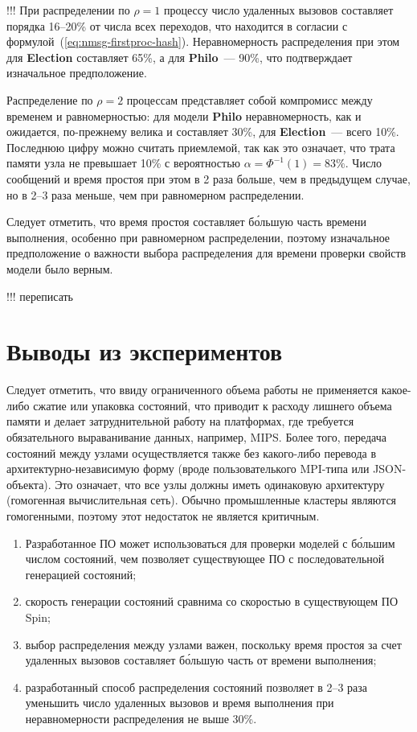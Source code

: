 \documentclass[12pt,a4paper,fleqn]{article}
\newcommand{\Code}[1]{\textbf{\mbox{#1}}}
\begin{document}
!!!
При распределении по $\rho = 1$ процессу число удаленных вызовов составляет порядка 16--20\% от
числа всех переходов, что находится в согласии с
формулой~(\ref{eq:nmsg-firstproc-hash}). Неравномерность распределения при этом для \Code{Election}
составляет 65\%, а для \Code{Philo}~--- 90\%, что подтверждает изначальное предположение.

Распределение по $\rho = 2$ процессам представляет собой компромисс между временем и равномерностью:
для модели \Code{Philo} неравномерность, как и ожидается, по-прежнему велика и составляет 30\%, для
\Code{Election}~--- всего 10\%. Последнюю цифру можно считать приемлемой, так как это означает, что
трата памяти узла не превышает 10\% с вероятностью $\alpha = \Phi^{-1}(1) = 83\%$. Число сообщений и
время простоя при этом в 2 раза больше, чем в предыдущем случае, но в 2--3 раза меньше, чем при
равномерном распределении.

Следует отметить, что время простоя составляет б\'{о}льшую часть времени выполнения, особенно при
равномерном распределении, поэтому изначальное предположение о важности выбора распределения для
времени проверки свойств модели было верным.

!!! переписать
\section*{Выводы из экспериментов}

Следует отметить, что ввиду ограниченного объема работы не применяется какое-либо сжатие или
упаковка состояний, что приводит к расходу лишнего объема памяти и делает затруднительной работу на
платформах, где требуется обязательного выраванивание данных, например, MIPS. Более того, передача
состояний между узлами осуществляется также без какого-либо перевода в архитектурно-независимую
форму (вроде пользователького MPI-типа или JSON-объекта). Это означает, что все узлы должны иметь
одинаковую архитектуру (гомогенная вычислительная сеть). Обычно промышленные кластеры являются
гомогенными, поэтому этот недостаток не является критичным.

\begin{enumerate}
\item Разработанное ПО может использоваться для проверки моделей с б\'{о}льшим числом
  состояний, чем позволяет существующее ПО с последовательной генерацией состояний;
\item скорость генерации состояний сравнима со скоростью в существующем ПО Spin;
\item выбор распределения между узлами важен, поскольку время простоя за счет удаленных
  вызовов составляет б\'{о}льшую часть от времени выполнения;
\item разработанный способ распределения состояний позволяет в 2--3 раза уменьшить число
  удаленных вызовов и время выполнения при неравномерности распределения не выше 30\%.
\end{enumerate}
\end{document}
